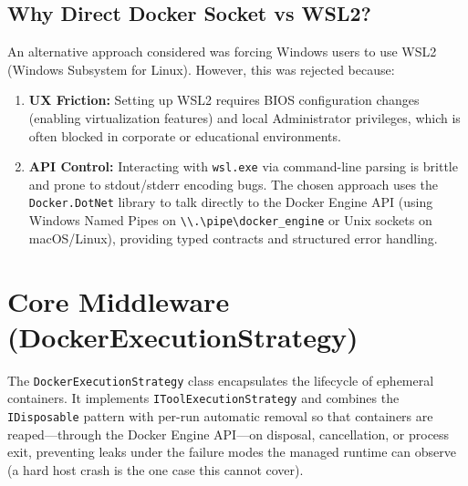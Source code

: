 \subsection{Why Direct Docker Socket vs WSL2?}
An alternative approach considered was forcing Windows users to use WSL2 (Windows Subsystem for Linux). However, this was rejected because:
\begin{enumerate}
    \item \textbf{UX Friction:} Setting up WSL2 requires BIOS configuration changes (enabling virtualization features) and local Administrator privileges, which is often blocked in corporate or educational environments.
    \item \textbf{API Control:} Interacting with \texttt{wsl.exe} via command-line parsing is brittle and prone to stdout/stderr encoding bugs. The chosen approach uses the \texttt{Docker.DotNet} library to talk directly to the Docker Engine API (using Windows Named Pipes on \texttt{\textbackslash\textbackslash.\textbackslash pipe\textbackslash docker\_engine} or Unix sockets on macOS/Linux), providing typed contracts and structured error handling.
\end{enumerate}

\section{Core Middleware (DockerExecutionStrategy)}
The \texttt{Docker\-Execution\-Strategy} class encapsulates the lifecycle of ephemeral containers. It implements \texttt{ITool\-Execution\-Strategy} and combines the \texttt{IDisposable} pattern with per-run automatic removal so that containers are reaped---through the Docker Engine API---on disposal, cancellation, or process exit, preventing leaks under the failure modes the managed runtime can observe (a hard host crash is the one case this cannot cover).

